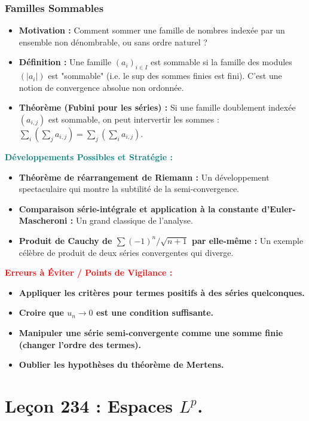 \documentclass[12pt, a4paper, parskip=full]{report}
\theoremstyle{agregstyle}
\newenvironment{developpements}
  {\par\medskip\noindent\begin{oframed}\noindent\textbf{\textcolor{teal}{Développements Possibles et Stratégie :}}}
  {\end{oframed}\par\medskip}
\newenvironment{erreurs}
  {\par\medskip\noindent\begin{oframed}\noindent\textbf{\textcolor{red}{Erreurs à Éviter / Points de Vigilance :}}}
  {\end{oframed}\par\medskip}
\begin{document}
\subsection{Familles Sommables}
\begin{itemize}
    \item \textbf{Motivation :} Comment sommer une famille de nombres indexée par un ensemble non dénombrable, ou sans ordre naturel ?
    \item \textbf{Définition :} Une famille $(a_i)_{i \in I}$ est sommable si la famille des modules $(|a_i|)$ est "sommable" (i.e. le sup des sommes finies est fini). C'est une notion de convergence absolue non ordonnée.
    \item \textbf{Théorème (Fubini pour les séries) :} Si une famille doublement indexée $(a_{i,j})$ est sommable, on peut intervertir les sommes : $\sum_i (\sum_j a_{i,j}) = \sum_j (\sum_i a_{i,j})$.
\end{itemize}

\begin{developpements}
    \begin{itemize}
        \item \textbf{Théorème de réarrangement de Riemann :} Un développement spectaculaire qui montre la subtilité de la semi-convergence.
        \item \textbf{Comparaison série-intégrale et application à la constante d'Euler-Mascheroni :} Un grand classique de l'analyse.
        \item \textbf{Produit de Cauchy de $\sum (-1)^n/\sqrt{n+1}$ par elle-même :} Un exemple célèbre de produit de deux séries convergentes qui diverge.
    \end{itemize}
\end{developpements}

\begin{erreurs}
    \begin{itemize}
        \item \textbf{Appliquer les critères pour termes positifs à des séries quelconques.}
        \item \textbf{Croire que $u_n \to 0$ est une condition suffisante.}
        \item \textbf{Manipuler une série semi-convergente comme une somme finie (changer l'ordre des termes).}
        \item \textbf{Oublier les hypothèses du théorème de Mertens.}
    \end{itemize}
\end{erreurs}
\chapter{Leçon 234 : Espaces $L^p$.}
\end{document}
